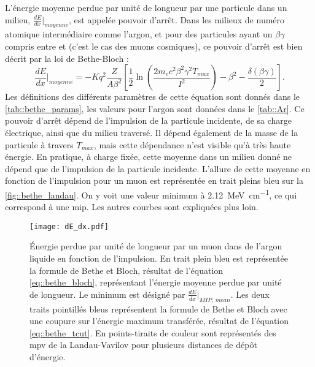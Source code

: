         L'énergie moyenne perdue par unité de longueur par une particule dans un milieu, $\frac{dE}{dx}\rvert_{moyenne}$, est appelée pouvoir d'arrêt. Dans les milieux de numéro atomique intermédiaire comme l'argon, et pour des particules ayant un $\beta\gamma$ compris entre  et  (c'est le cas des muons cosmiques), ce pouvoir d'arrêt est bien décrit par la loi de Bethe-Bloch\cite{pdg2018} :
        \begin{equation}\label{eq::bethe_bloch}
          \frac{dE}{dx}\biggr\rvert_{moyenne} = -Kq^2 \frac{Z}{A\beta^2}\left[\frac{1}{2}\ln\left(\frac{2m_ec^2\beta^2\gamma^2T_{max}}{I^2}\right)-\beta^2-\frac{\delta(\beta\gamma)}{2} \right].
        \end{equation}
        Les définitions des différents paramètres de cette équation sont donnés dans le \autoref{tab::bethe_params}, les valeurs pour l'argon sont données dans le \autoref{tab::Ar}. Ce pouvoir d'arrêt dépend de l'impulsion de la particule incidente, de sa charge électrique, ainsi que du milieu traversé. Il dépend également de la masse de la particule à travers $T_{max}$, mais cette dépendance n'est visible qu'à très haute énergie\cite{pdg2018}. En pratique, à charge fixée, cette moyenne dans un milieu donné ne dépend que de l'impulsion de la particule incidente. L'allure de cette moyenne en fonction de l'impulsion pour un muon est représentée en trait pleins bleu sur la \autoref{fig::bethe_landau}. On y voit une valeur minimum à \SI{2.12}{\mega\electronvolt\per\centi\meter}, ce qui correspond à une \gls{mip}. Les autres courbes sont expliquées plus loin.

        \begin{figure}[htbp]
          \centering
          \texttt{[image: dE\_dx.pdf]}
          \caption[Énergie perdue par unité de longueur par un muon dans de l'argon liquide en fonction de l'impulsion.]{\label{fig::bethe_landau}Énergie perdue par unité de longueur par un muon dans de l'argon liquide en fonction de l'impulsion. En trait plein bleu est représentée la formule de Bethe et Bloch, résultat de l'équation \eqref{eq::bethe_bloch}, représentant l'énergie moyenne perdue par unité de longueur. Le minimum est désigné par $\frac{dE}{dx}\rvert_{MIP,\,mean}$. Les deux traits pointillés bleus représentent la formule de Bethe et Bloch avec une coupure sur l'énergie maximum transférée, résultat de l'équation \eqref{eq::bethe_tcut}. En points-tiraits de couleur sont représentés des \gls{mpv} de la Landau-Vavilov pour plusieurs distances de dépôt d'énergie.}
        \end{figure}

